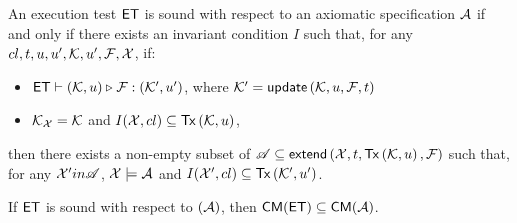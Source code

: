 \begin{definition}
\label{def:main-body-et_sound}
An execution test $\mathsf{ET}$ is sound with respect to an axiomatic 
specification $\mathcal{A}$ if and only if
there exists an invariant condition $I$ such that, 
for any ${cl}, t, u, u', \mathcal{K}, u', \mathcal{F}, \mathcal{X}$, if:
\begin{itemize}
    \item $\mathsf{ET} \vdash (\mathcal{K}, u) \triangleright_{} \mathcal{F}: (\mathcal{K}',u')$, where \( \mkvs' = \updateKV[\mkvs, \vi ,\fp, \txid]\)
    \item  $\mathcal{K}_{\mathcal{X}} = \mathcal{K}$ and $I(\aexec, \cl) \subseteq \Tx[\mkvs, \vi]$,
\end{itemize}
then there exists a non-empty subset of $\mathscr{A} \subseteq \extend[\aexec, \txid, \Tx[\hh, \vi], \fp]$ 
such that, for any $\mathcal{X}' in \mathscr{A}$, $\mathcal{X} \models \mathcal{A}$ and $I(\aexec', \cl) \subseteq \Tx[\mkvs', \vi']$.
%
\end{definition}

\begin{theorem}
\label{thm:main-body-et_soundness}
If $\mathsf{ET}$ is sound with respect to $(\mathcal{A})$, then $\CMs(\ET) \subseteq \CMs(\Ax)$.
\end{theorem}

